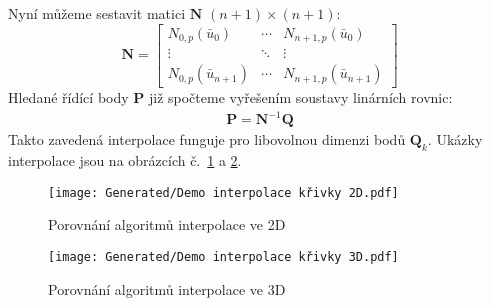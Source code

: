 Nyní můžeme sestavit matici $\bm{N}$ $(n + 1) \times (n + 1)$:
\begin{equation}
    \bm{N} = \begin{bmatrix}
        N_{0,p}(\bar{u}_0)        & \cdots & N_{n+1,p}(\bar{u}_0)       \\
        \vdots                    & \ddots & \vdots                     \\
        N_{0, p}(\bar{u}_{n + 1}) & \cdots & N_{n+1,p}(\bar{u}_{n + 1})
    \end{bmatrix}
\end{equation}
Hledané řídící body $\bm{P}$ již spočteme vyřešením soustavy linárních rovnic:
\begin{align}
    \bm{P} = \bm{N}^{-1}\bm{Q}
\end{align}
Takto zavedená interpolace funguje pro libovolnou dimenzi bodů $\bm{Q}_k$.
Ukázky interpolace jsou na obrázcích č.~\ref{fig:Demo interpolace 2D} a \ref{fig:Demo interpolace 3D}.
\begin{imagepage}
    \begin{figure}[H]
        \centering
        \texttt{[image: Generated/Demo interpolace křivky 2D.pdf]}
        \caption{Porovnání algoritmů interpolace ve 2D}
        \label{fig:Demo interpolace 2D}
    \end{figure}
    \begin{figure}[H]
        \centering
        \texttt{[image: Generated/Demo interpolace křivky 3D.pdf]}
        \caption{Porovnání algoritmů interpolace ve 3D}
        \label{fig:Demo interpolace 3D}
    \end{figure}
\end{imagepage}
